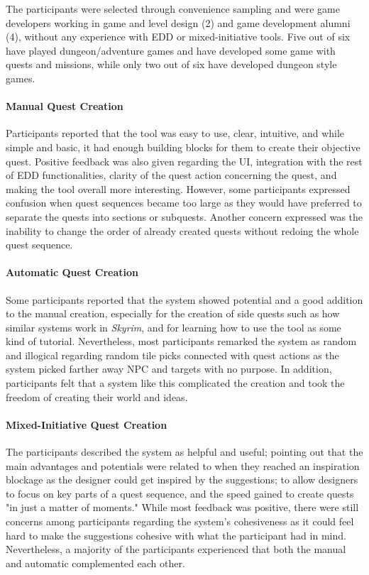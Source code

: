 The participants were selected through convenience sampling and were game developers working in game and level design (2) and game development alumni (4), without any experience with EDD or mixed-initiative tools. Five out of six have played dungeon/adventure games and have developed some game with quests and missions, while only two out of six have developed dungeon style games.

\paragraph{Manual Quest Creation}

Participants reported that the tool was easy to use, clear, intuitive, and while simple and basic, it had enough building blocks for them to create their objective quest. Positive feedback was also given regarding the UI, integration with the rest of EDD functionalities, clarity of the quest action concerning the quest, and making the tool overall more interesting. However, some participants expressed confusion when quest sequences became too large as they would have preferred to separate the quests into sections or subquests. Another concern expressed was the inability to change the order of already created quests without redoing the whole quest sequence.

\paragraph{Automatic Quest Creation}

Some participants reported that the system showed potential and a good addition to the manual creation, especially for the creation of side quests such as how similar systems work in \emph{Skyrim}, and for learning how to use the tool as some kind of tutorial. Nevertheless, most participants remarked the system as random and illogical regarding random tile picks connected with quest actions as the system picked farther away NPC and targets with no purpose. In addition, participants felt that a system like this complicated the creation and took the freedom of creating their world and ideas. 

\paragraph{Mixed-Initiative Quest Creation}

The participants described the system as helpful and useful; pointing out that the main advantages and potentials were related to when they reached an inspiration blockage as the designer could get inspired by the suggestions; to allow designers to focus on key parts of a quest sequence, and the speed gained to create quests "in just a matter of moments." While most feedback was positive, there were still concerns among participants regarding the system's cohesiveness as it could feel hard to make the suggestions cohesive with what the participant had in mind. Nevertheless, a majority of the participants experienced that both the manual and automatic complemented each other.

